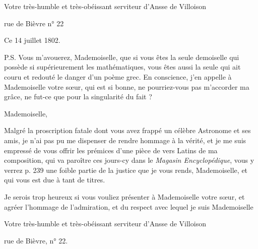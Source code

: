 \documentclass[11pt,a4paper]{article}
\begin{document}
Votre très-humble et très-obéissant serviteur d'Ansse de Villoison

rue de Bièvre n° 22

Ce 14 juillet 1802.

P.S. Vous m'avouerez, Mademoiselle, que si vous êtes la seule demoiselle qui
possède si supérieurement les mathématiques, vous êtes aussi la seule qui ait
couru et redouté le danger d'un poème grec. En conscience, j'en appelle à
Mademoiselle votre sœur, qui est si bonne, ne pourriez-vous pas m'accorder ma
grâce, ne fut-ce que pour la singularité du fait ?


Mademoiselle,

Malgré la proscription fatale dont vous avez frappé un célèbre Astronome et ses
amis, je n'ai pas pu me dispenser de rendre hommage à la vérité, et je me suis
empressé de vous offrir les prémices d'une pièce de vers Latins de ma
composition, qui va paroître ces jours-cy dans le \emph{Magasin
Encyclopédique}, vous y verrez p. 239 une foible partie de la justice que je
vous rends, Mademoiselle, et qui vous est due à tant de titres.

Je serois trop heureux si vous vouliez présenter à Mademoiselle votre sœur, et
agréer l'hommage de l'admiration, et du respect avec lequel je suis
Mademoiselle

Votre très-humble et très-obéissant serviteur d'Ansse de Villoison

rue de Bièvre, n° 22.
\end{document}
